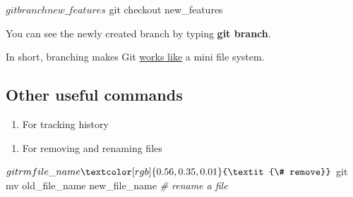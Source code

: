 \documentclass[
]{book}
\newenvironment{Shaded}{\begin{snugshade}}{\end{snugshade}}
\newcommand{\AttributeTok}[1]{\textcolor[rgb]{0.13,0.29,0.53}{#1}}
\newcommand{\CommentTok}[1]{\textcolor[rgb]{0.56,0.35,0.01}{\textit{#1}}}
\newcommand{\ExtensionTok}[1]{#1}
\newcommand{\NormalTok}[1]{#1}
\newcommand{\OperatorTok}[1]{\textcolor[rgb]{0.81,0.36,0.00}{\textbf{#1}}}
\providecommand{\tightlist}{%
  \setlength{\itemsep}{0pt}\setlength{\parskip}{0pt}}
\begin{document}
\begin{Shaded}
\begin{Highlighting}[]
\ExtensionTok{$}\NormalTok{ git branch new\_features}
\ExtensionTok{$}\NormalTok{ git checkout new\_features}
\end{Highlighting}
\end{Shaded}

You can see the newly created branch by typing \textbf{git branch}.

In short, branching makes Git \href{https://git-scm.com/book/en/v2/Getting-Started-Git-Basics}{works like} a mini file system.

\subsection{Other useful commands}\label{other-useful-commands}

\begin{enumerate}
\def\labelenumi{\arabic{enumi}.}
\tightlist
\item
  For tracking history
\end{enumerate}

\begin{Shaded}
\end{Shaded}

\begin{enumerate}
\def\labelenumi{\arabic{enumi}.}
\setcounter{enumi}{1}
\tightlist
\item
  For removing and renaming files
\end{enumerate}

\begin{Shaded}
\begin{Highlighting}[]
\ExtensionTok{$}\NormalTok{ git rm file\_name }\CommentTok{\# remove}
\ExtensionTok{$}\NormalTok{ git mv old\_file\_name new\_file\_name }\CommentTok{\# rename a file}
\end{Highlighting}
\end{Shaded}
\end{document}
